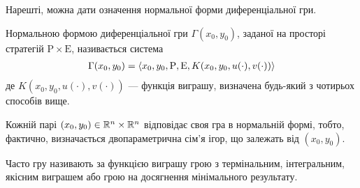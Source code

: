 Нарешті, можна дати означення нормальної форми диференціальної гри.
\begin{definition}
    Нормальною формою диференціальної гри $\Gamma (x_0, y_0)$, заданої на просторі стратегій $\mathrm{P} \times \mathrm{E}$, називається система
    \begin{gather}
        \Gamma (x_0, y_0) = \left<x_0, y_0, \mathrm {P}, \mathrm{E}, K(x_0, y_0, u(\cdot), v(\cdot)) \right>
    \end{gather}
    де $K(x_0, y_0, u(\cdot), v(\cdot))$ --- функція виграшу, визначена будь-який з чотирьох способів вище.
\end{definition}
\begin{remark}
    Кожній парі $(x_0, y_0) \in \mathbb{R}^n \times \mathbb{R}^n$ відповідає своя гра в нормальній формі, тобто, фактично,
    визначається двопараметрична сім'я ігор, що залежать від $(x_0, y_0)$.
\end{remark}
Часто гру називають за функцією виграшу грою з термінальним, інтегральним, якісним виграшем або грою на досягнення мінімального результату.